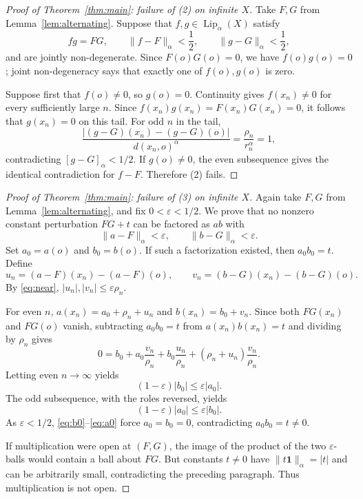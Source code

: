 \documentclass[11pt]{article}
\newcommand{\Lip}{\operatorname{Lip}}
\newcommand{\eps}{\varepsilon}
\newcommand{\seminorm}[1]{[#1]_{\alpha}}
\begin{document}
\begin{proof}[Proof of Theorem~\ref{thm:main}: failure of (2) on infinite $X$]
Take $F,G$ from Lemma~\ref{lem:alternating}.  Suppose that
$f,g\in\Lip_\alpha(X)$ satisfy
\[
fg=FG,
\qquad
\|f-F\|_\alpha<\frac12,
\qquad
\|g-G\|_\alpha<\frac12,
\]
and are jointly non-degenerate.  Since $F(o)G(o)=0$, we have
$f(o)g(o)=0$; joint non-degeneracy says that exactly one of $f(o),g(o)$ is
zero.

Suppose first that $f(o)\ne0$, so $g(o)=0$.  Continuity gives
$f(x_n)\ne0$ for every sufficiently large $n$.  Since
$f(x_n)g(x_n)=F(x_n)G(x_n)=0$, it follows that $g(x_n)=0$ on this tail.  For
odd $n$ in the tail,
\[
\frac{|(g-G)(x_n)-(g-G)(o)|}{d(x_n,o)^\alpha}
=\frac{\rho_n}{r_n^\alpha}=1,
\]
contradicting $\seminorm{g-G}<1/2$.  If $g(o)\ne0$, the even subsequence gives
the identical contradiction for $f-F$.  Therefore (2) fails.
\end{proof}

\begin{proof}[Proof of Theorem~\ref{thm:main}: failure of (3) on infinite $X$]
Again take $F,G$ from Lemma~\ref{lem:alternating}, and fix
$0<\eps<1/2$.  We prove that no nonzero constant perturbation $FG+t$ can be
factored as $ab$ with
\begin{equation}\label{eq:near}
\|a-F\|_\alpha<\eps,
\qquad
\|b-G\|_\alpha<\eps.
\end{equation}
Set $a_0=a(o)$ and $b_0=b(o)$.  If such a factorization existed, then
$a_0b_0=t$.  Define
\[
u_n=(a-F)(x_n)-(a-F)(o),
\qquad
v_n=(b-G)(x_n)-(b-G)(o).
\]
By \eqref{eq:near}, $|u_n|,|v_n|\le\eps\rho_n$.

For even $n$,
$a(x_n)=a_0+\rho_n+u_n$ and $b(x_n)=b_0+v_n$.  Since both $FG(x_n)$ and
$FG(o)$ vanish, subtracting $a_0b_0=t$ from
$a(x_n)b(x_n)=t$ and dividing by $\rho_n$ gives
\[
0=b_0+a_0\frac{v_n}{\rho_n}
  +b_0\frac{u_n}{\rho_n}
  +(\rho_n+u_n)\frac{v_n}{\rho_n}.
\]
Letting even $n\to\infty$ yields
\begin{equation}\label{eq:b0}
(1-\eps)|b_0|\le\eps|a_0|.
\end{equation}
The odd subsequence, with the roles reversed, yields
\begin{equation}\label{eq:a0}
(1-\eps)|a_0|\le\eps|b_0|.
\end{equation}
As $\eps<1/2$, \eqref{eq:b0}--\eqref{eq:a0} force
$a_0=b_0=0$, contradicting $a_0b_0=t\ne0$.

If multiplication were open at $(F,G)$, the image of the product of the two
$\eps$-balls would contain a ball about $FG$.  But constants $t\ne0$ have
$\|t\mathbf1\|_\alpha=|t|$ and can be arbitrarily small, contradicting the
preceding paragraph.  Thus multiplication is not open.
\end{proof}
\end{document}
